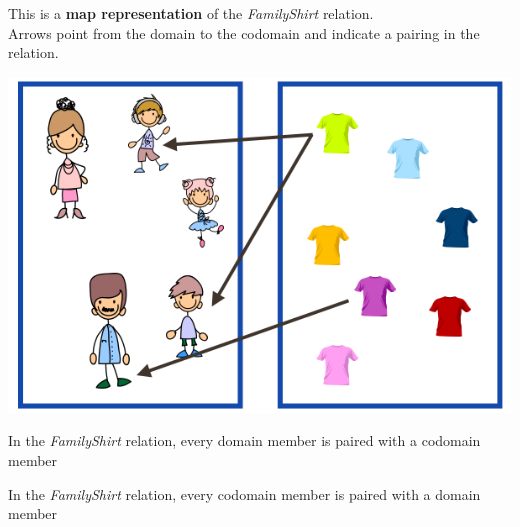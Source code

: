 \documentclass{ximera}
\author{Lee Wayand}
\begin{document}
\begin{exercise}

This is a \textbf{map representation} of the \textit{FamilyShirt} relation. \\


Arrows point from the domain to the codomain and indicate a pairing in the relation.


\begin{image}
\includegraphics{../../pics/func_maps/f_2.png}
\end{image}




\begin{question} 
In the \textit{FamilyShirt} relation, every domain member is paired with a codomain member

\begin{multipleChoice}
\end{multipleChoice}
\end{question}







\begin{question} 
In the \textit{FamilyShirt} relation, every codomain member is paired with a domain member

\begin{multipleChoice}
\end{multipleChoice}
\end{question}








\end{exercise}
\end{document}
